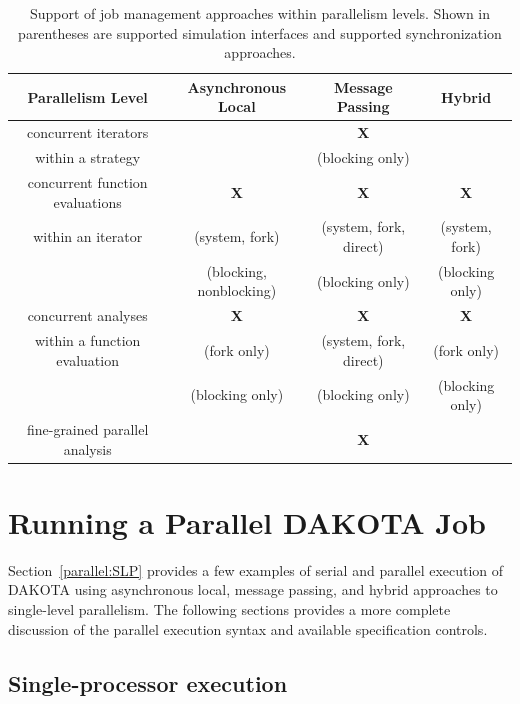 \begin{table}
  \centering
  \caption{Support of job management approaches within parallelism levels.
  Shown in parentheses are supported simulation interfaces and supported
  synchronization approaches.}
  \label{parallel:table01}\vspace{2mm}
  \begin{tabular}{c||c|c|c|}
    \textbf{Parallelism Level} & \textbf{Asynchronous Local} &
    \textbf{Message Passing} & \textbf{Hybrid} \\
    \hline \hline
    concurrent iterators & & \textbf{X}      & \\
    within a strategy    & & (blocking only) & \\
    \hline
    concurrent function evaluations & \textbf{X} & \textbf{X} & \textbf{X} \\
    within an iterator          & (system, fork) & (system, fork, direct) &
    (system, fork) \\
    & (blocking, nonblocking) & (blocking only) & (blocking only) \\
    \hline
    concurrent analyses & \textbf{X} & \textbf{X} & \textbf{X} \\
    within a function evaluation & (fork only) & (system, fork, direct) &
    (fork only) \\
    & (blocking only) & (blocking only) & (blocking only) \\
    \hline
    fine-grained parallel analysis & & \textbf{X} & \\
    \hline
  \end{tabular}
\end{table}


\section{Running a Parallel DAKOTA Job}\label{parallel:running}


Section~\ref{parallel:SLP} provides a few examples of serial and
parallel execution of DAKOTA using asynchronous local, message
passing, and hybrid approaches to single-level parallelism.  The
following sections provides a more complete discussion of the parallel
execution syntax and available specification controls.


\subsection{Single-processor execution}\label{parallel:running:single}

